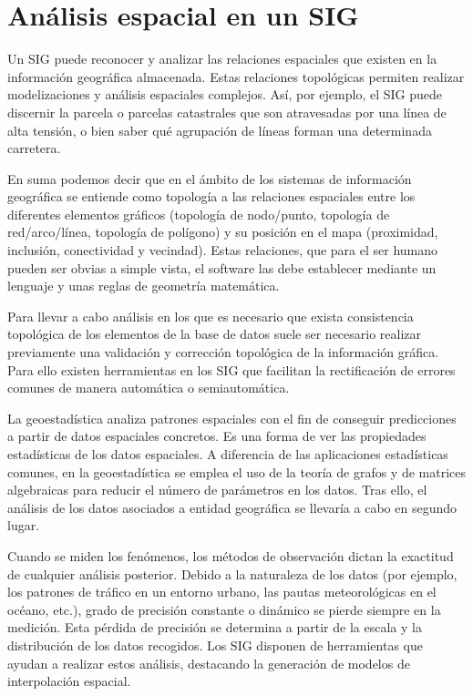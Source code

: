 \section{Análisis espacial en un SIG}
\label{sec:cap2-analisis-espacial-sig}

Un SIG puede reconocer y analizar las relaciones espaciales que existen en la información geográfica almacenada.
Estas relaciones topológicas permiten realizar modelizaciones y análisis espaciales complejos. Así, por ejemplo, 
el SIG puede discernir la parcela o parcelas catastrales que son atravesadas por una línea de alta tensión, o bien
saber qué agrupación de líneas forman una determinada carretera.

En suma podemos decir que en el ámbito de los sistemas de información geográfica se entiende como topología a las 
relaciones espaciales entre los diferentes elementos gráficos (topología de nodo/punto, topología de red/arco/línea, 
topología de polígono) y su posición en el mapa (proximidad, inclusión, conectividad y vecindad). Estas relaciones, 
que para el ser humano pueden ser obvias a simple vista, el software las debe establecer mediante un lenguaje y unas
reglas de geometría matemática.

Para llevar a cabo análisis en los que es necesario que exista consistencia topológica de los elementos de la base de 
datos suele ser necesario realizar previamente una validación y corrección topológica de la información gráfica. 
Para ello existen herramientas en los SIG que facilitan la rectificación de errores comunes de manera automática o 
semiautomática.

La geoestadística analiza patrones espaciales con el fin de conseguir predicciones a partir de datos espaciales concretos.
Es una forma de ver las propiedades estadísticas de los datos espaciales. A diferencia de las aplicaciones estadísticas 
comunes, en la geoestadística se emplea el uso de la teoría de grafos y de matrices algebraicas para reducir el número de 
parámetros en los datos. Tras ello, el análisis de los datos asociados a entidad geográfica se llevaría a cabo en segundo 
lugar.

Cuando se miden los fenómenos, los métodos de observación dictan la exactitud de cualquier análisis posterior. Debido a 
la naturaleza de los datos (por ejemplo, los patrones de tráfico en un entorno urbano, las pautas meteorológicas en el 
océano, etc.), grado de precisión constante o dinámico se pierde siempre en la medición. Esta pérdida de precisión se 
determina a partir de la escala y la distribución de los datos recogidos. Los SIG disponen de herramientas que ayudan a 
realizar estos análisis, destacando la generación de modelos de interpolación espacial.


